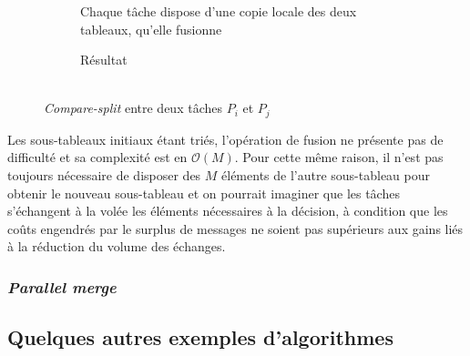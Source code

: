 \begin{figure}[!h]
\begin{center}
\begin{subfigure}[b]{0.40\columnwidth}
\begin{center}
\caption{Chaque tâche dispose d'une copie locale des deux tableaux, qu'elle fusionne}
\label{fig:bitonic4}
\end{center}
\end{subfigure}%
\hfill
\begin{subfigure}[b]{0.2\columnwidth}
\begin{center}
\caption{Résultat\\~}
\label{fig:bitonic5}
\end{center}
\end{subfigure}
\end{center}
\caption{\textit{Compare-split} entre deux tâches $P_i$ et $P_j$}
\end{figure}

Les sous-tableaux initiaux étant triés, l'opération de fusion ne présente pas de difficulté et sa complexité est en $\mathcal{O}(M)$. Pour cette même raison, il n'est pas toujours nécessaire de disposer des $M$ éléments de l'autre sous-tableau pour obtenir le nouveau sous-tableau et on pourrait imaginer que les tâches s'échangent à la volée les éléments nécessaires à la décision, à condition que les coûts engendrés par le surplus de messages ne soient pas supérieurs aux gains liés à la réduction du volume des échanges.

\subsubsection{\textit{Parallel merge}}

\subsection{Quelques autres exemples d'algorithmes}